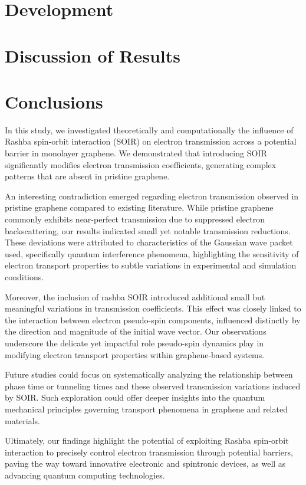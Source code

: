 \documentclass[twocolumn]{revtex4-2}
\begin{document}
    \section{Development}\label{sec:development}
    

    \section{Discussion of Results}\label{sec:discussion-of-results}
    

    \section{Conclusions}\label{sec:conclusions}

    In this study, we investigated theoretically and computationally the influence of Rashba spin-orbit interaction (SOIR) on electron transmission across a potential barrier in monolayer graphene.
    We demonstrated that introducing SOIR significantly modifies electron transmission coefficients, generating complex patterns that are absent in pristine graphene.

    An interesting contradiction emerged regarding electron transmission observed in pristine graphene compared to existing literature.
    While pristine graphene commonly exhibits near-perfect transmission due to suppressed electron backscattering, our results indicated small yet notable transmission reductions.
    These deviations were attributed to characteristics of the Gaussian wave packet used, specifically quantum interference phenomena, highlighting the sensitivity of electron transport properties to subtle variations in experimental and simulation conditions.

    Moreover, the inclusion of rashba SOIR introduced additional small but meaningful variations in transmission coefficients.
    This effect was closely linked to the interaction between electron pseudo-spin components, influenced distinctly by the direction and magnitude of the initial wave vector.
    Our observations underscore the delicate yet impactful role pseudo-spin dynamics play in modifying electron transport properties within graphene-based systems.

    Future studies could focus on systematically analyzing the relationship between phase time or tunneling times and these observed transmission variations induced by SOIR. Such exploration could offer deeper insights into the quantum mechanical principles governing transport phenomena in graphene and related materials.

    Ultimately, our findings highlight the potential of exploiting Rashba spin-orbit interaction to precisely control electron transmission through potential barriers, paving the way toward innovative electronic and spintronic devices, as well as advancing quantum computing technologies.



    
    
\end{document}
